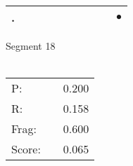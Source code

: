\documentclass[landscape]{article}
\newcommand{\ssp}{\hspace{2pt}}
\newcommand{\mex}{\cellcolor{g}$\bullet$}
\begin{document}
\begin{tabular}{|l|p{10pt}|p{10pt}|p{10pt}|p{10pt}|p{10pt}|p{10pt}|p{10pt}|p{10pt}|p{10pt}|}
\hline
\ssp \cellcolor{ref8}. \ssp&\hspace{2pt}&\hspace{2pt}&\hspace{2pt}&\hspace{2pt}&\hspace{2pt}&\hspace{2pt}&\hspace{2pt}&\hspace{2pt}&\hspace{2pt}\mex\\
\hline
\end{tabular}

\vspace{6pt}
\noindent Segment 18\\\\
\noindent\begin{tabular}{lm{12pt}r}
\hline
P:&&0.200\\
R:&&0.158\\
Frag:&&0.600\\
Score:&&0.065\\
\end{tabular}

\newpage
\end{document}
